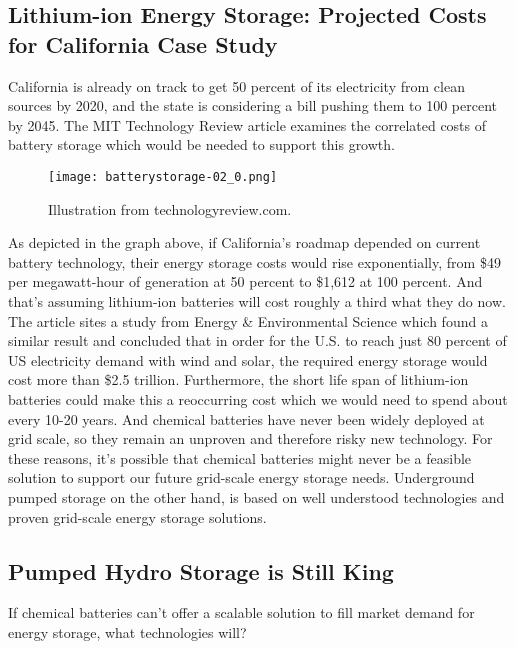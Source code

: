 \documentclass[hidelinks,12pt,a4paper]{article}
\begin{document}
\subsection{Lithium-ion Energy Storage: Projected Costs for California Case Study}

California is already on track to get 50 percent of its electricity from clean sources by 2020, and the state is considering a bill pushing them to 100 percent by 2045. The MIT Technology Review article examines the correlated costs of battery storage which would be needed to support this growth.

\begin{figure}[ht!]
    \centering
    \texttt{[image: batterystorage-02\_0.png]}
    \caption{Illustration from technologyreview.com. \cite{TheTwoPointFiveTrillionReasonWeCantRelyOnBatteries}}
\end{figure}
\FloatBarrier

As depicted in the graph above, if California's roadmap depended on current battery technology, their energy storage costs would rise exponentially, from \$49 per megawatt-hour of generation at 50 percent to \$1,612 at 100 percent. And that's assuming lithium-ion batteries will cost roughly a third what they do now. The article sites a study from Energy \& Environmental Science which found a similar result and concluded that in order for the U.S. to reach just 80 percent of US electricity demand with wind and solar, the required energy storage would cost more than \$2.5 trillion. \cite{TheTwoPointFiveTrillionReasonWeCantRelyOnBatteries} Furthermore, the short life span of lithium-ion batteries could make this a reoccurring cost which we would need to spend about every 10-20 years. And chemical batteries have never been widely deployed at grid scale, so they remain an unproven and therefore risky new technology. For these reasons, it's possible that chemical batteries might never be a feasible solution to support our future grid-scale energy storage needs. Underground pumped storage on the other hand, is based on well understood technologies and proven grid-scale energy storage solutions.

\subsection{Pumped Hydro Storage is Still King}
If chemical batteries can't offer a scalable solution to fill market demand for energy storage, what technologies will?
\end{document}
